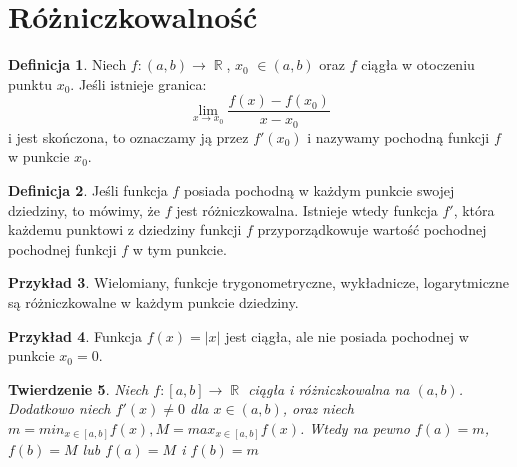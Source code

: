 \documentclass[12pt,a4paper]{article}
\newtheorem{tw}{Twierdzenie}[section]
\theoremstyle{definition}
\newtheorem{df}[tw]{Definicja}
\newtheorem{ex}[tw]{Przykład}
\DeclareMathOperator{\R}{\mathbb{R}}
\begin{document}
\section{Różniczkowalność}
\begin{df}Niech $f : (a, b) \rightarrow \R$, $x_{0}$ $\in (a, b)$ oraz $f$ ciągła w otoczeniu punktu $x_{0}$. Jeśli istnieje granica:
\[ 
\lim_{x\rightarrow x_{0}}\frac{f(x) - f(x_{0})}{x - x_{0}} 
\]
i jest skończona, to oznaczamy ją przez $f'(x_{0})$ i nazywamy pochodną funkcji $f$ w punkcie ${x_{0}}$.
\end{df}
\begin{df}Jeśli funkcja $f$ posiada pochodną w każdym punkcie swojej dziedziny, to mówimy, że $f$ jest różniczkowalna. Istnieje wtedy funkcja $f'$, która 
każdemu
punktowi z dziedziny funkcji $f$ przyporządkowuje wartość pochodnej pochodnej
funkcji $f$ w tym punkcie.
\end{df}
\begin{ex}
Wielomiany, funkcje trygonometryczne, wykładnicze, logarytmiczne są różniczkowalne w każdym punkcie dziedziny.
\end{ex}
\begin{ex}
Funkcja $f(x) = |x|$ jest ciągła, ale nie posiada pochodnej w punkcie
$x_{0} = 0$.
\end{ex}
\begin{tw}
Niech $f : [a, b] \rightarrow \R$ ciągła i różniczkowalna na $(a, b)$. Dodatkowo niech $f'(x) \neq 0$ dla $x \in (a, b)$, oraz niech $m = min_{x \in [a,b]}f(x), 
M = max_{x \in [a,b]} f(x)$.
Wtedy na pewno $f(a) = m$, $f(b) = M$ lub $f(a) = M$ i $f(b) = m$
\end{tw}
\end{document}
